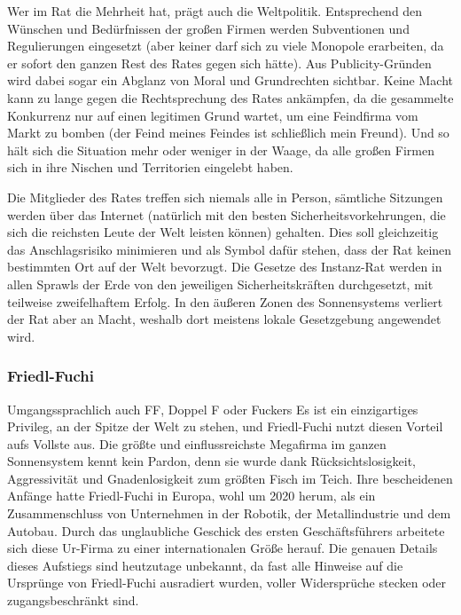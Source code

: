 Wer im Rat die Mehrheit hat, prägt auch die Weltpolitik. Entsprechend den Wünschen und Bedürfnissen der großen Firmen werden Subventionen und Regulierungen eingesetzt (aber keiner darf sich zu viele Monopole erarbeiten, da er sofort den ganzen Rest des Rates gegen sich hätte). Aus Publicity-Gründen wird dabei sogar ein Abglanz von Moral und Grundrechten sichtbar. Keine Macht kann zu lange gegen die Rechtsprechung des Rates ankämpfen, da die gesammelte Konkurrenz nur auf einen legitimen Grund wartet, um eine Feindfirma vom Markt zu bomben (der Feind meines Feindes ist schließlich mein Freund). Und so hält sich die Situation mehr oder weniger in der Waage, da alle großen Firmen sich in ihre Nischen und Territorien eingelebt haben.

Die Mitglieder des Rates treffen sich niemals alle in Person, sämtliche Sitzungen werden über das Internet (natürlich mit den besten Sicherheitsvorkehrungen, die sich die reichsten Leute der Welt leisten können) gehalten. Dies soll gleichzeitig das Anschlagsrisiko minimieren und als Symbol dafür stehen, dass der Rat keinen bestimmten Ort auf der Welt bevorzugt. Die Gesetze des Instanz-Rat werden in allen Sprawls der Erde von den jeweiligen Sicherheitskräften durchgesetzt, mit teilweise zweifelhaftem Erfolg. In den äußeren Zonen des Sonnensystems verliert der Rat aber an Macht, weshalb dort meistens \glqq lokale\grqq{} Gesetzgebung angewendet wird.
\subsubsection{Friedl-Fuchi}
Umgangssprachlich auch \glqq FF\grqq{}, \glqq Doppel F\grqq{} oder \glqq Fuckers\grqq{}
Es ist ein einzigartiges Privileg, an der Spitze der Welt zu stehen, und Friedl-Fuchi nutzt diesen Vorteil aufs Vollste aus. Die größte und einflussreichste Megafirma im ganzen Sonnensystem kennt kein Pardon, denn sie wurde dank Rücksichtslosigkeit, Aggressivität und Gnadenlosigkeit zum größten Fisch im Teich. Ihre bescheidenen Anfänge hatte Friedl-Fuchi in Europa, wohl um 2020 herum, als ein Zusammenschluss von Unternehmen in der Robotik, der Metallindustrie und dem Autobau. Durch das unglaubliche Geschick des ersten Geschäftsführers arbeitete sich diese Ur-Firma zu einer internationalen Größe herauf. Die genauen Details dieses Aufstiegs sind heutzutage unbekannt, da fast alle Hinweise auf die Ursprünge von Friedl-Fuchi ausradiert wurden, voller Widersprüche stecken oder zugangsbeschränkt sind.

